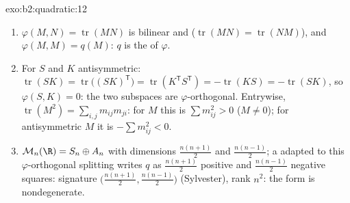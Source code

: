 \begin{solution}{exo:b2:quadratic:12}
\begin{enumerate}
  \item $\varphi(M, N) = \operatorname{tr}(MN)$ is bilinear and
         ($\operatorname{tr}(MN) =
        \operatorname{tr}(NM)$), and $\varphi(M, M) = q(M)$:
        $q$ is the  of $\varphi$.
  \item For $S$  and $K$ antisymmetric:
        $\operatorname{tr}(SK) =
        \operatorname{tr}\bigl((SK)^{\mathsf T}\bigr) =
        \operatorname{tr}(K^{\mathsf T}S^{\mathsf T}) =
        -\operatorname{tr}(KS) = -\operatorname{tr}(SK)$, so
        $\varphi(S, K) = 0$: the two subspaces are
        $\varphi$-orthogonal. Entrywise, $\operatorname{tr}
        (M^2) = \sum_{i,j} m_{ij}m_{ji}$: for  $M$
        this is $\sum m_{ij}^2 > 0$ ($M \neq 0$); for
        antisymmetric $M$ it is $-\sum m_{ij}^2 < 0$.
  \item $\mathcal M_n(\R) = S_n \oplus A_n$ with dimensions
        $\frac{n(n+1)}2$ and $\frac{n(n-1)}2$; a  adapted to this $\varphi$-orthogonal
        splitting writes $q$ as $\frac{n(n+1)}2$ positive and
        $\frac{n(n-1)}2$ negative squares: signature
        $\bigl(\frac{n(n+1)}2, \frac{n(n-1)}2\bigr)$
        (Sylvester), rank $n^2$: the form is nondegenerate.
\end{enumerate}
\end{solution}

